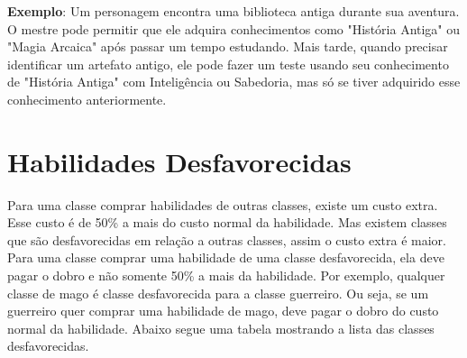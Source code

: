 \textbf{Exemplo}: Um personagem encontra uma biblioteca antiga durante sua aventura. O mestre pode permitir que ele adquira conhecimentos como "História Antiga" ou "Magia Arcaica" após passar um tempo estudando. Mais tarde, quando precisar identificar um artefato antigo, ele pode fazer um teste usando seu conhecimento de "História Antiga" com Inteligência ou Sabedoria, mas só se tiver adquirido esse conhecimento anteriormente.




\section{Habilidades Desfavorecidas}

Para uma classe comprar habilidades de outras classes, existe um custo extra. Esse custo é de 50\% a mais do custo normal da habilidade. Mas existem classes que são desfavorecidas em relação a outras classes, assim o custo extra é maior. Para uma classe comprar uma habilidade de uma classe desfavorecida, ela deve pagar o dobro e não somente 50\% a mais da habilidade. Por exemplo, qualquer classe de mago é classe desfavorecida para a classe guerreiro. Ou seja, se um guerreiro quer comprar uma habilidade de mago, deve pagar o dobro do custo normal da habilidade. Abaixo segue uma tabela mostrando a lista das classes desfavorecidas.


